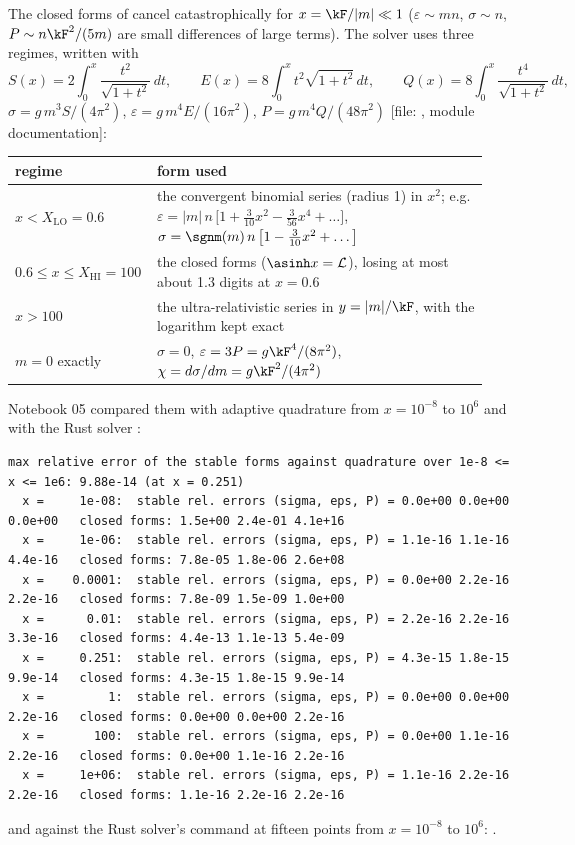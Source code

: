 The closed forms of  cancel catastrophically for $x=\kF/|m|\ll1$ ($\varepsilon\sim mn$,
$\sigma\sim n$, $P\sim n\kF^2/(5m)$ are small differences of large terms). The solver uses three regimes,
written with
\[
  S(x)=2\int_0^x\frac{t^2}{\sqrt{1+t^2}}\,dt,\qquad E(x)=8\int_0^xt^2\sqrt{1+t^2}\,dt,\qquad
  Q(x)=8\int_0^x\frac{t^4}{\sqrt{1+t^2}}\,dt,
\]
$\sigma=g\,m^3S/(4\pi^2)$, $\varepsilon=g\,m^4E/(16\pi^2)$, $P=g\,m^4Q/(48\pi^2)$ [file:
, module documentation]:
\begin{center}
\small
\renewcommand{\arraystretch}{1.3}
\begin{tabular}{@{}>{\raggedright\arraybackslash}p{0.25\linewidth}>{\raggedright\arraybackslash}p{0.69\linewidth}@{}}
\toprule
regime & form used\\
\midrule
$x<X_{\mathrm{LO}}=0.6$ & the convergent binomial series (radius 1) in $x^2$; e.g.
$\varepsilon=|m|\,n\,\bigl[1+\tfrac{3}{10}x^2-\tfrac{3}{56}x^4+\dots\bigr]$,
$\sigma=\sgnm(m)\,n\,\bigl[1-\tfrac{3}{10}x^2+\dots\bigr]$\\
$0.6\leq x\leq X_{\mathrm{HI}}=100$ & the closed forms ($\asinh x=\mathcal L$), losing at most about 1.3
digits at $x=0.6$\\
$x>100$ & the ultra-relativistic series in $y=|m|/\kF$, with the logarithm kept exact\\
$m=0$ exactly & $\sigma=0$, $\varepsilon=3P=g\kF^4/(8\pi^2)$, $\chi=d\sigma/dm=g\kF^2/(4\pi^2)$\\
\bottomrule
\end{tabular}
\end{center}
Notebook 05 compared them with adaptive quadrature from $x=10^{-8}$ to $10^{6}$ and with the Rust solver
:
\begin{Verbatim}[fontsize=\tiny]
max relative error of the stable forms against quadrature over 1e-8 <= x <= 1e6: 9.88e-14 (at x = 0.251)
  x =     1e-08:  stable rel. errors (sigma, eps, P) = 0.0e+00 0.0e+00 0.0e+00   closed forms: 1.5e+00 2.4e-01 4.1e+16
  x =     1e-06:  stable rel. errors (sigma, eps, P) = 1.1e-16 1.1e-16 4.4e-16   closed forms: 7.8e-05 1.8e-06 2.6e+08
  x =    0.0001:  stable rel. errors (sigma, eps, P) = 0.0e+00 2.2e-16 2.2e-16   closed forms: 7.8e-09 1.5e-09 1.0e+00
  x =      0.01:  stable rel. errors (sigma, eps, P) = 2.2e-16 2.2e-16 3.3e-16   closed forms: 4.4e-13 1.1e-13 5.4e-09
  x =     0.251:  stable rel. errors (sigma, eps, P) = 4.3e-15 1.8e-15 9.9e-14   closed forms: 4.3e-15 1.8e-15 9.9e-14
  x =         1:  stable rel. errors (sigma, eps, P) = 0.0e+00 0.0e+00 2.2e-16   closed forms: 0.0e+00 0.0e+00 2.2e-16
  x =       100:  stable rel. errors (sigma, eps, P) = 0.0e+00 1.1e-16 2.2e-16   closed forms: 0.0e+00 1.1e-16 2.2e-16
  x =     1e+06:  stable rel. errors (sigma, eps, P) = 1.1e-16 2.2e-16 2.2e-16   closed forms: 1.1e-16 2.2e-16 2.2e-16
\end{Verbatim}
and against the Rust solver's  command at fifteen points from $x=10^{-8}$ to $10^{6}$:
.

